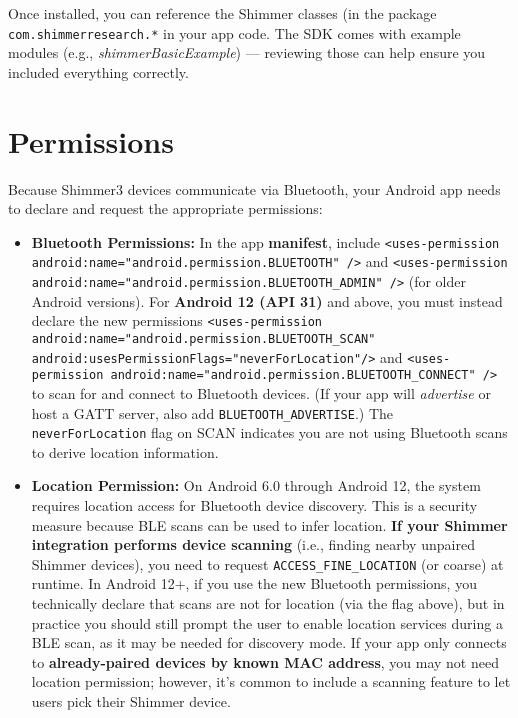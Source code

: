 Once installed, you can reference the Shimmer classes (in the package
\texttt{com.shimmerresearch.*} in your app code. The SDK comes with example
modules (e.g., \textit{shimmerBasicExample}) --- reviewing those can help ensure
you included everything correctly.

\section{Permissions}

Because Shimmer3 devices communicate via Bluetooth, your Android app
needs to declare and request the appropriate permissions:

\begin{itemize}
\item \textbf{Bluetooth Permissions:} In the app \textbf{manifest}, include
  \texttt{<uses-permission android:name="android.permission.BLUETOOTH" />} and
  \texttt{<uses-permission android:name="android.permission.BLUETOOTH_ADMIN" />}
  (for older Android versions). For \textbf{Android 12 (API 31)} and above,
  you must instead declare the new permissions
  \texttt{<uses-permission android:name="android.permission.BLUETOOTH_SCAN" android:usesPermissionFlags="neverForLocation"/>}
  and
  \texttt{<uses-permission android:name="android.permission.BLUETOOTH_CONNECT" />}
  to scan for and connect to Bluetooth
  devices\cite{ElectrodermalActivityWiki}.
  (If your app will \textit{advertise} or host a GATT server, also add
  \texttt{BLUETOOTH_ADVERTISE}.) The \texttt{neverForLocation} flag on SCAN indicates
  you are not using Bluetooth scans to derive location information.

\item \textbf{Location Permission:} On Android 6.0 through Android 12, the system
  requires location access for Bluetooth device discovery. This is a
  security measure because BLE scans can be used to infer location. \textbf{If
  your Shimmer integration performs device scanning} (i.e., finding
  nearby unpaired Shimmer devices), you need to request
  \texttt{ACCESS_FINE_LOCATION} (or coarse) at
  runtime\cite{ElectrodermalActivityWiki}.
  In Android 12+, if you use the new Bluetooth permissions, you
  technically declare that scans are not for location (via the flag
  above), but in practice you should still prompt the user to enable
  location services during a BLE scan, as it may be needed for discovery
  mode. If your app only connects to \textbf{already-paired devices by known
  MAC address}, you may not need location permission; however, it's
  common to include a scanning feature to let users pick their Shimmer
  device.


\end{itemize}
